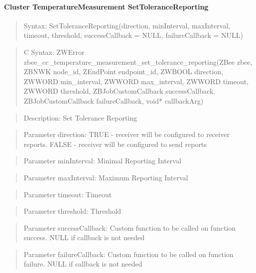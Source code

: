 \paragraph{Cluster TemperatureMeasurement SetToleranceReporting}
\begin{quote}Syntax: SetToleranceReporting(direction, minInterval, maxInterval, timeout, threshold, successCallback = NULL, failureCallback = NULL)\end{quote}
\begin{quote}C Syntax: ZWError zbee\_cc\_temperature\_measurement\_set\_tolerance\_reporting(ZBee zbee, ZBNWK node\_id, ZEndPoint endpoint\_id, ZWBOOL direction, ZWWORD min\_interval, ZWWORD max\_interval, ZWWORD timeout, ZWWORD threshold, ZBJobCustomCallback successCallback, ZBJobCustomCallback failureCallback, void* callbackArg)\end{quote}
\begin{quote}Description: Set Tolerance Reporting\end{quote}
\begin{quote}Parameter direction: TRUE  - receiver will be configured to receiver reports. FALSE - receiver will be configured to send reports\end{quote}
\begin{quote}Parameter minInterval: Minimal Reporting Interval\end{quote}
\begin{quote}Parameter maxInterval: Maximum Reporting Interval\end{quote}
\begin{quote}Parameter timeout: Timeout\end{quote}
\begin{quote}Parameter threshold: Threshold\end{quote}
\begin{quote}Parameter successCallback: Custom function to be called on function success. NULL if callback is not needed\end{quote}
\begin{quote}Parameter failureCallback: Custom function to be called on function failure. NULL if callback is not needed\end{quote}


